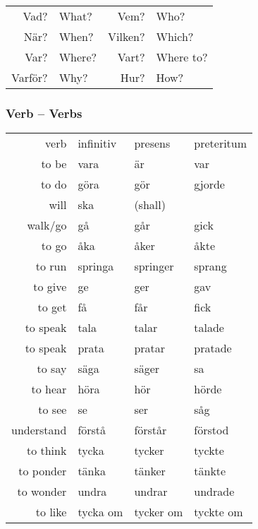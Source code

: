 \documentclass[14pt]{refcard} %
\begin{document}
\begin{tabular}{rl rl}

Vad?       & What?     & Vem?       & Who?      \\
När?       & When?     & Vilken?    & Which?    \\
Var?       & Where?    & Vart?      & Where to? \\
Varför?    & Why?      & Hur?       & How?      \\
\end{tabular}


\subsubsection{Verb -- Verbs}

\begin{tabular}{@{}rlll}
verb      & infinitiv & presens   & preteritum \\[1ex]
to be     & vara      & är        & var        \\
to do     & göra      & gör       & gjorde     \\
will      & ska       & (shall)   &            \\
walk/go   & gå        & går       & gick       \\
to go     & åka       & åker      & åkte       \\
to run    & springa   & springer  & sprang     \\[1ex]
to give   & ge        & ger       & gav        \\
to get    & få        & får       & fick       \\[1ex]
to speak  & tala      & talar     & talade     \\
to speak  & prata     & pratar    & pratade    \\
to say    & säga      & säger     & sa         \\
to hear   & höra      & hör       & hörde      \\
to see    & se        & ser       & såg        \\
\footnotesize understand
          & förstå    & förstår   & förstod    \\
to think  & tycka     & tycker    & tyckte     \\
to ponder & tänka     & tänker    & tänkte     \\
to wonder & undra     & undrar    & undrade    \\
to like   & \footnotesize tycka om  & \footnotesize tycker om & \footnotesize tyckte om  \\

\end{tabular}
\end{document}
